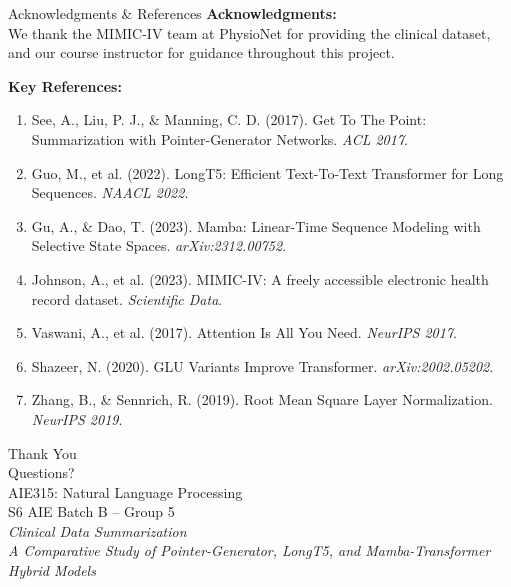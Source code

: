 \documentclass[10pt, aspectratio=169]{beamer}
\begin{document}
\begin{frame}{Acknowledgments \& References}
  \textbf{Acknowledgments:}\\
  We thank the MIMIC-IV team at PhysioNet for providing the clinical dataset, and our course instructor for guidance throughout this project.

  \vspace{0.4cm}

  \textbf{Key References:}
  \begin{enumerate}
    \item[\tiny{[1]}] {\scriptsize See, A., Liu, P. J., \& Manning, C. D. (2017). Get To The Point: Summarization with Pointer-Generator Networks. \textit{ACL 2017}.}
    \item[\tiny{[2]}] {\scriptsize Guo, M., et al. (2022). LongT5: Efficient Text-To-Text Transformer for Long Sequences. \textit{NAACL 2022}.}
    \item[\tiny{[3]}] {\scriptsize Gu, A., \& Dao, T. (2023). Mamba: Linear-Time Sequence Modeling with Selective State Spaces. \textit{arXiv:2312.00752}.}
    \item[\tiny{[4]}] {\scriptsize Johnson, A., et al. (2023). MIMIC-IV: A freely accessible electronic health record dataset. \textit{Scientific Data}.}
    \item[\tiny{[5]}] {\scriptsize Vaswani, A., et al. (2017). Attention Is All You Need. \textit{NeurIPS 2017}.}
    \item[\tiny{[6]}] {\scriptsize Shazeer, N. (2020). GLU Variants Improve Transformer. \textit{arXiv:2002.05202}.}
    \item[\tiny{[7]}] {\scriptsize Zhang, B., \& Sennrich, R. (2019). Root Mean Square Layer Normalization. \textit{NeurIPS 2019}.}
  \end{enumerate}
\end{frame}

{
\begin{frame}
  \begin{center}
    \vspace{1.5cm}
    {\Huge \textcolor{ieeeblue}{Thank You}}\\
    \vspace{0.8cm}
    {\Large Questions?}\\
    \vspace{1.0cm}
    {\normalsize
      AIE315: Natural Language Processing\\
      S6 AIE Batch B -- Group 5\\
      \vspace{0.3cm}
      \textit{Clinical Data Summarization}\\
      \textit{A Comparative Study of Pointer-Generator, LongT5, and Mamba-Transformer Hybrid Models}
    }
  \end{center}
\end{frame}
}
\end{document}
